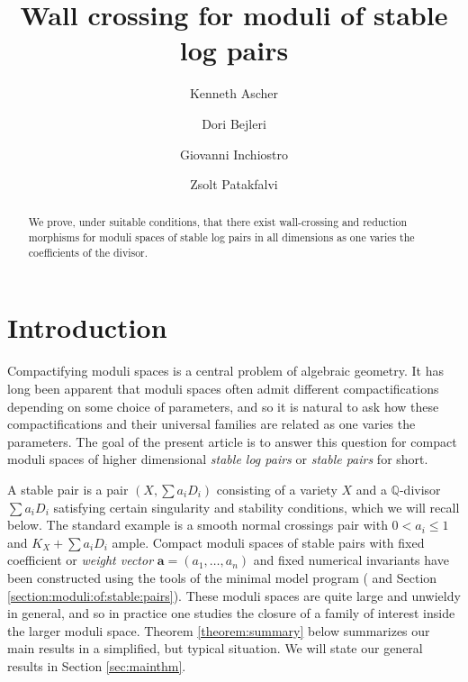 \documentclass[11pt]{amsart}
\author{Kenneth Ascher}
\author{Dori Bejleri}
\author{Giovanni Inchiostro}
\author{Zsolt Patakfalvi}
\title{Wall crossing for moduli of stable log pairs}
\theoremstyle{definition}
\theoremstyle{remark}
\newcommand{\bfa}{\mathbf{a}}
\begin{document}
	
	\begin{abstract} 
		We prove, under suitable conditions, that there exist wall-crossing and reduction morphisms for moduli spaces of stable log pairs in all dimensions as one varies the coefficients of the divisor. 
		
	\end{abstract}
	
	
	
	
	\maketitle
	
	
	
	
	\section{Introduction}
	
	Compactifying moduli spaces is a central problem of algebraic geometry. It has long been apparent that moduli spaces often admit different compactifications depending on some choice of parameters, and so it is natural to ask how these compactifications and their universal families are related as one varies the parameters. The goal of the present article is to answer this question for compact moduli spaces of higher dimensional \emph{stable log pairs} or \emph{stable pairs} for short. 
	
	A stable pair is a pair $(X, \sum a_i D_i)$ consisting of a variety $X$ and a $\mathbb{Q}$-divisor $\sum a_i D_i$ satisfying certain singularity and stability conditions, which we will recall below. The standard example is a smooth normal crossings pair with $0 < a_i \le 1$ and $K_X + \sum a_i D_i$ ample. Compact moduli spaces of stable pairs with fixed coefficient or \emph{weight vector} $\bfa = (a_1, \ldots, a_n)$ and fixed numerical invariants have been constructed using the tools of the minimal model program (\cite{kollarmodulibook} and Section \ref{section:moduli:of:stable:pairs}). These moduli spaces are quite large and unwieldy in general, and so in practice one studies the closure of a family of interest inside the larger moduli space.  Theorem \ref{theorem:summary} below summarizes our main results in a simplified, but typical situation. We will state our general results in Section \ref{sec:mainthm}. 
	
\end{document}
